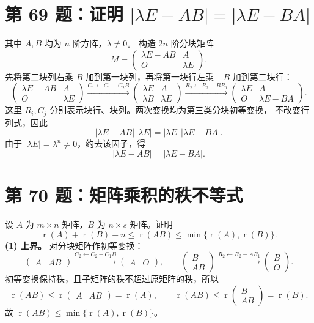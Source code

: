 \documentclass[11pt,a4paper,fontset=fandol]{ctexart}
\newcommand{\rk}{\operatorname{r}}
\newcommand{\ans}[1]{\boxed{#1}}
\newcommand{\problem}[1]{\Needspace{9\baselineskip}\section*{#1}}
\begin{document}
\newpage
\problem{第 69 题：证明 $|\lambda E-AB|=|\lambda E-BA|$}
其中 $A,B$ 均为 $n$ 阶方阵，$\lambda\ne0$。
构造 $2n$ 阶分块矩阵
\[
M=\begin{pmatrix}\lambda E-AB&A\\O&\lambda E\end{pmatrix}.
\]
先将第二块列右乘 $B$ 加到第一块列，再将第一块行左乘 $-B$ 加到第二块行：
\[
\begin{pmatrix}\lambda E-AB&A\\O&\lambda E\end{pmatrix}
\xrightarrow{C_1\leftarrow C_1+C_2B}
\begin{pmatrix}\lambda E&A\\\lambda B&\lambda E\end{pmatrix}
\xrightarrow{R_2\leftarrow R_2-BR_1}
\begin{pmatrix}\lambda E&A\\O&\lambda E-BA\end{pmatrix}.
\]
这里 $R_i,C_j$ 分别表示块行、块列。两次变换均为第三类分块初等变换，
不改变行列式，因此
\[
|\lambda E-AB|\,|\lambda E|
=|\lambda E|\,|\lambda E-BA|.
\]
由于 $|\lambda E|=\lambda^n\ne0$，约去该因子，得
\[
\ans{|\lambda E-AB|=|\lambda E-BA|}.
\]

\problem{第 70 题：矩阵乘积的秩不等式}
设 $A$ 为 $m\times n$ 矩阵，$B$ 为 $n\times s$ 矩阵。证明
\[
\rk(A)+\rk(B)-n\le\rk(AB)\le\min\{\rk(A),\rk(B)\}.
\]
\textbf{(1) 上界。}
对分块矩阵作初等变换：
\[
\begin{pmatrix}A&AB\end{pmatrix}
\xrightarrow{C_2\leftarrow C_2-C_1B}
\begin{pmatrix}A&O\end{pmatrix},
\qquad
\begin{pmatrix}B\\AB\end{pmatrix}
\xrightarrow{R_2\leftarrow R_2-AR_1}
\begin{pmatrix}B\\O\end{pmatrix}.
\]
初等变换保持秩，且子矩阵的秩不超过原矩阵的秩，所以
\[
\rk(AB)\le\rk\begin{pmatrix}A&AB\end{pmatrix}=\rk(A),
\qquad
\rk(AB)\le\rk\begin{pmatrix}B\\AB\end{pmatrix}=\rk(B).
\]
故 $\rk(AB)\le\min\{\rk(A),\rk(B)\}$。
\end{document}
